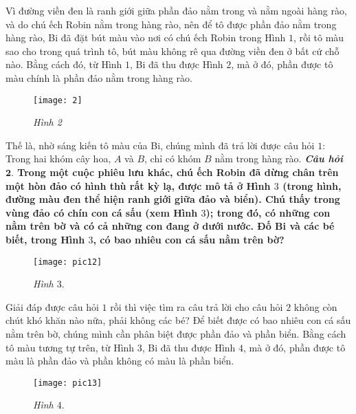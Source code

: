 	\vskip 0.1cm
	Vì đường viền đen là ranh giới giữa phần đảo nằm trong và nằm ngoài hàng rào, và do chú ếch Robin nằm trong hàng rào, nên để tô được phần đảo nằm trong hàng rào, Bi đã đặt bút màu vào nơi có chú ếch Robin trong Hình $1$, rồi tô màu sao cho trong quá trình tô, bút màu không rê qua đường viền đen ở bất cứ chỗ nào. Bằng cách đó, từ Hình $1$, Bi đã thu được Hình $2$, mà ở đó, phần được tô màu chính là phần đảo nằm trong hàng rào.
	\begin{figure}[H]
		\centering
		\captionsetup{labelformat= empty, justification=centering}
		\texttt{[image: 2]}
		\caption{\small\textit{Hình 2}}
		\vspace*{-15pt}
	\end{figure}
 	Thế là, nhờ sáng kiến tô màu của Bi, chúng  mình đã trả lời được câu hỏi $1$: Trong hai khóm cây hoa, $A$ và $B$, chỉ có khóm $B$ nằm trong hàng rào.
	\vskip 0.1cm
	\textbf{\textit{Câu hỏi $\pmb{2.}$} {\color{abc}Trong một cuộc phiêu lưu khác, chú ếch Robin đã dừng chân trên một hòn đảo có hình thù rất kỳ lạ, được mô tả ở Hình $3$ (trong hình, đường màu đen thể hiện ranh giới giữa đảo và biển). Chú thấy trong vùng đảo có chín con cá sấu (xem Hình $3$); trong đó, có những con nằm trên bờ và có cả những con đang ở dưới nước. Đố Bi và các bé biết, trong Hình $3$, có bao nhiêu con cá sấu nằm trên bờ?}}
	\begin{figure}[H]
		\centering
		\vspace*{-10pt}
		\captionsetup{labelformat= empty, justification=centering}
		\texttt{[image: pic12]}
		\caption{\small\textit{Hình $3.$}}
		\vspace*{-10pt}
	\end{figure}
	Giải đáp được câu hỏi $1$ rồi thì việc tìm ra câu trả lời cho câu hỏi $2$ không còn chút khó khăn nào nữa, phải không các bé?
	\vskip 0.1cm
	Để biết được có bao nhiêu con cá sấu nằm trên bờ, chúng mình cần phân biệt được phần đảo và phần biển. Bằng cách tô màu tương tự trên, từ Hình $3$, Bi đã thu được Hình $4$, mà ở đó, phần được tô màu là phần đảo và phần không có màu là phần biển.
	\begin{figure}[H]
		\centering
		\vspace*{-10pt}
		\captionsetup{labelformat= empty, justification=centering}
		\texttt{[image: pic13]}
		\caption{\small\textit{Hình $4.$}}
		\vspace*{-10pt}
	\end{figure}
